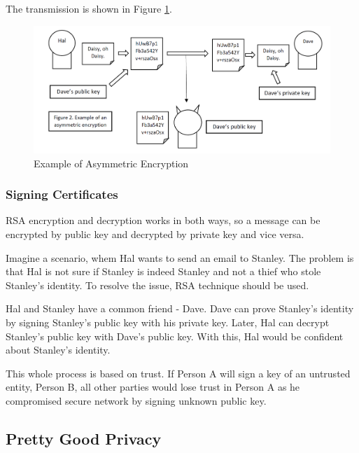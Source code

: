\documentclass[a4paper, 12pt]{article}
\begin{document}
The transmission is shown in Figure \ref{fig:asymmetric}.

\begin{figure}[h!]
  \begin{center}
    \includegraphics[width=\textwidth]{asymmetric.png}
    \caption{Example of Asymmetric Encryption}
    \label{fig:asymmetric}
    \end{center}
  \end{figure}

\subsubsection{Signing Certificates}
\label{bbsec:signing}

RSA encryption and decryption works in both ways, so a
message can be encrypted by public key and decrypted by private key and vice versa.

Imagine a scenario, whem Hal wants to send an email to Stanley. The problem is that Hal is not sure
if Stanley is indeed Stanley and not a thief who stole Stanley's identity. To resolve the issue, RSA
technique should be used. 

Hal and Stanley have a common friend - Dave. Dave can prove Stanley's identity by signing Stanley's
public key with his private key. Later, Hal can decrypt Stanley's public key with Dave's public key.
With this, Hal would be confident about Stanley's identity.

This whole process is based on trust. If Person A will sign a key of an untrusted entity, Person B, all other parties
would lose trust in Person A as he compromised secure network by signing unknown public key.

\subsection{Pretty Good Privacy}
\label{bbsec:pgp}
\end{document}
